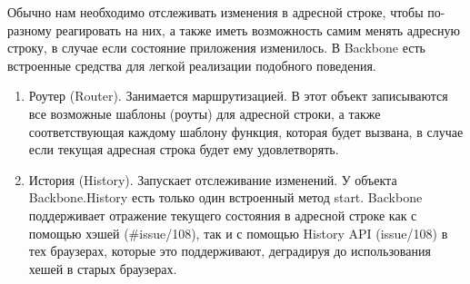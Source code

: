 Обычно нам необходимо отслеживать изменения в адресной строке, чтобы по-разному реагировать на них, а также иметь возможность самим менять адресную строку, в случае если состояние приложения изменилось. В Backbone есть встроенные средства для легкой реализации подобного поведения.
\begin{enumerate}
\item Роутер (Router). Занимается маршрутизацией. В этот объект записываются все возможные шаблоны (роуты) для адресной строки, а также соответствующая каждому шаблону функция, которая будет вызвана, в случае если текущая адресная строка будет ему удовлетворять.

\item История (History). Запускает отслеживание изменений. У объекта Backbone.History есть только один встроенный метод start. Backbone поддерживает отражение текущего состояния в адресной строке как с помощью хэшей (\#issue/108), так и с помощью History API (issue/108) в тех браузерах, которые это поддерживают, деградируя до использования хешей в старых браузерах\cite{}.
\end{enumerate}
